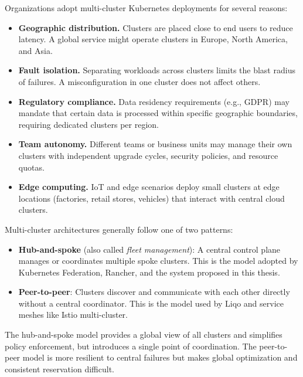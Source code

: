 Organizations adopt multi-cluster Kubernetes deployments for several reasons:

\begin{itemize}
    \item \textbf{Geographic distribution.} Clusters are placed close to end users to reduce latency. A global service might operate clusters in Europe, North America, and Asia.

    \item \textbf{Fault isolation.} Separating workloads across clusters limits the blast radius of failures. A misconfiguration in one cluster does not affect others.

    \item \textbf{Regulatory compliance.} Data residency requirements (e.g., GDPR) may mandate that certain data is processed within specific geographic boundaries, requiring dedicated clusters per region.

    \item \textbf{Team autonomy.} Different teams or business units may manage their own clusters with independent upgrade cycles, security policies, and resource quotas.

    \item \textbf{Edge computing.} IoT and edge scenarios deploy small clusters at edge locations (factories, retail stores, vehicles) that interact with central cloud clusters.
\end{itemize}

Multi-cluster architectures generally follow one of two patterns:

\begin{itemize}
    \item \textbf{Hub-and-spoke} (also called \textit{fleet management}): A central control plane manages or coordinates multiple spoke clusters. This is the model adopted by Kubernetes Federation, Rancher, and the system proposed in this thesis.

    \item \textbf{Peer-to-peer}: Clusters discover and communicate with each other directly without a central coordinator. This is the model used by Liqo and service meshes like Istio multi-cluster.
\end{itemize}

The hub-and-spoke model provides a global view of all clusters and simplifies policy enforcement, but introduces a single point of coordination. The peer-to-peer model is more resilient to central failures but makes global optimization and consistent reservation difficult.


